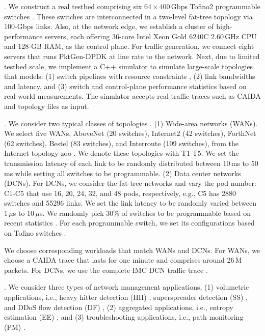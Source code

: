 . We construct a real testbed comprising six \(64 \times 400\)\,Gbps Tofino2 programmable switches \cite{tofino2}. These switches are interconnected in a two-level fat-tree topology via 100-Gbps links. Also, at the network edge, we establish a cluster of high-performance servers, each offering 36-core Intel Xeon Gold 6240C 2.60\,GHz CPU and 128-GB RAM, as the control plane. For traffic generation, we connect eight servers that runs PktGen-DPDK \cite{pktgen} at line rate to the network. Next, due to limited testbed scale, we implement a C++ simulator to simulate large-scale topologies that models: (1) switch pipelines with resource constraints \cite{jose2015compiling}, (2) link bandwidths and latency, and (3) switch and control-plane performance statistics based on real-world measurements. The simulator accepts real traffic traces such as CAIDA \cite{caida} and topology files as input.

. We consider two typical classes of topologies \cite{anup2022hetero,chen2024eagle}. (1) Wide-area networks (WANs). We select five WANs, AboveNet (20 switches), Internet2 (42 switches), ForthNet (62 switches), Bestel (83 switches), and Interroute (109 switches), from the Internet topology zoo \cite{knight2011internet}. We denote these topologies with T1-T5. We set the transmission latency of each link to be randomly distributed between 10\,ms to 50\,ms while setting all switches to be programmable. (2) Data center networks (DCNs). For DCNs, we consider the fat-tree networks and vary the pod number: C1-C5 that use 16, 20, 24, 32, and 48 pods, respectively, e.g., C5 has 2880 switches and 55296 links. We set the link latency to be randomly varied between 1\,$\mu$s to 10\,$\mu$s. We randomly pick 30\% of switches to be programmable based on recent statistics \cite{telecom}. For each programmable switch, we set its configurations based on Tofino switches \cite{jose2015compiling}.

We choose corresponding workloads that match WANs and DCNs. For WANs, we choose a CAIDA trace \cite{caida} that lasts for one minute and comprises around 26\,M packets. For DCNs, we use the complete IMC DCN traffic trace \cite{benson2010network}. 

. We consider three types of network management applications, (1) volumetric applications, i.e., heavy hitter detection (HH) \cite{huang2017sketchvisor}, superspreader detection (SS) \cite{tang2019mv}, and DDoS flow detection (DF) \cite{liu2021jaqen}, (2) aggregated applications, i.e., entropy estimation (EE) \cite{liu2016one}, and (3) troubleshooting applications, i.e., path monitoring (PM) \cite{ben2020pint,sheng2021deltaint}. 

